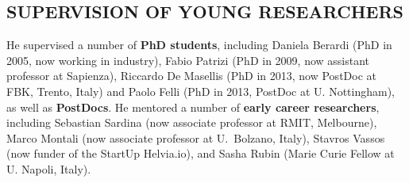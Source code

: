 \vspace{-2ex}
\subsection*{SUPERVISION OF YOUNG RESEARCHERS}
\vspace{-2ex}
He supervised a number of \textbf{PhD students}, including Daniela Berardi (PhD in 2005, now working in industry), Fabio Patrizi (PhD in 2009, now assistant professor at Sapienza), Riccardo De Masellis (PhD in 2013, now PostDoc at FBK, Trento, Italy) and Paolo Felli (PhD in 2013, PostDoc at U. Nottingham), as well as 
\textbf{PostDocs}. %
He mentored a number of \textbf{early career researchers}, including Sebastian Sardina (now associate professor at RMIT, Melbourne), Marco Montali (now associate professor at U.\ Bolzano, Italy), Stavros Vassos (now funder of the StartUp Helvia.io), and Sasha Rubin (Marie Curie Fellow at U. Napoli, Italy).


\vspace{-2ex}
